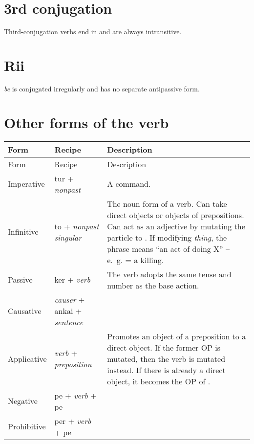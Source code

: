 \documentclass{book}
\begin{document}

\section{3rd conjugation}

Third-conjugation verbs end in  and are always intransitive.


\section{Rii}

 \emph{be} is conjugated irregularly and has no separate antipassive form.


\section{Other forms of the verb}

\begin{longtabu}[c]{|l|l|X|}
    \hline
    Form & Recipe & Description \\
    \hline
    \endfirsthead
    
    \hline
    Form & Recipe & Description \\
    \hline
    \endhead
    
    \hline
    \endfoot
    
    \hline
    \endlastfoot
    
    Imperative & tur + \emph{nonpast} & A command. \\
    Infinitive & to + \emph{nonpast singular} & The noun form of a verb. Can take direct objects or objects of prepositions. Can act as an adjective by mutating the particle to . If modifying  \emph{thing}, the phrase means ``an act of doing X'' -- e.~g.  = a killing. \\
    Passive & ker + \emph{verb} & The verb adopts the same tense and number as the base action. \\
    Causative & \emph{causer} + ankai + \emph{sentence} & \\
    Applicative & \emph{verb} + \emph{preposition} & Promotes an object of a preposition to a direct object. If the former OP is mutated, then the verb is mutated instead. If there is already a direct object, it becomes the OP of . \\
    Negative & pe + \emph{verb} + pe & \\
    Prohibitive & per + \emph{verb} + pe & \\
\end{longtabu}
\end{document}
